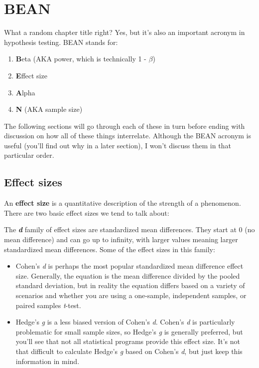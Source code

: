 \documentclass[
]{book}
\providecommand{\tightlist}{%
  \setlength{\itemsep}{0pt}\setlength{\parskip}{0pt}}
\begin{document}
\hypertarget{bean}{%
\chapter{BEAN}\label{bean}}

What a random chapter title right? Yes, but it's also an important acronym in hypothesis testing. BEAN stands for:

\begin{enumerate}
\def\labelenumi{\arabic{enumi}.}
\tightlist
\item
  \textbf{B}eta (AKA power, which is technically 1 - \(\beta\))
\item
  \textbf{E}ffect size
\item
  \textbf{A}lpha
\item
  \textbf{N} (AKA sample size)
\end{enumerate}

The following sections will go through each of these in turn before ending with discussion on how all of these things interrelate. Although the BEAN acronym is useful (you'll find out why in a later section), I won't discuss them in that particular order.

\hypertarget{effect-sizes}{%
\section{Effect sizes}\label{effect-sizes}}

An \textbf{effect size} is a quantitative description of the strength of a phenomenon. There are two basic effect sizes we tend to talk about:

The \textbf{\emph{d}} family of effect sizes are standardized mean differences. They start at 0 (no mean difference) and can go up to infinity, with larger values meaning larger standardized mean differences. Some of the effect sizes in this family:

\begin{itemize}
\item
  Cohen's \emph{d} is perhaps the most popular standardized mean difference effect size. Generally, the equation is the mean difference divided by the pooled standard deviation, but in reality the equation differs based on a variety of scenarios and whether you are using a one-sample, independent samples, or paired samples \emph{t}-test.
\item
  Hedge's \emph{g} is a less biased version of Cohen's \emph{d}. Cohen's \emph{d} is particularly problematic for small sample sizes, so Hedge's \emph{g} is generally preferred, but you'll see that not all statistical programs provide this effect size. It's not that difficult to calculate Hedge's \emph{g} based on Cohen's \emph{d}, but just keep this information in mind.
\end{itemize}
\end{document}
